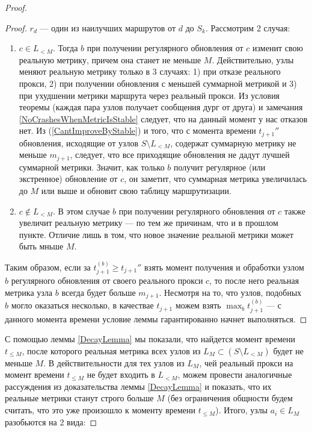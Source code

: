 \documentclass{article}
\theoremstyle{plain}
\theoremstyle{plain}
\theoremstyle{plain}
\theoremstyle{plain}
\theoremstyle{definition}
\theoremstyle{remark}
\theoremstyle{plain}
\begin{document}
\begin{proof}
\begin{proof}
         $r_d$ --- один из наилучших маршрутов от $d$ до $S_k$. Рассмотрим 2 случая:
        
        \begin{enumerate}
            \item $c \in L_{< M}$. Тогда $b$ при получении регулярного обновления от $c$ изменит свою реальную метрику, причем она станет не меньше $M$. Действительно, узлы меняют реальную метрику только в 3 случаях: 1) при отказе реального прокси, 2) при получении обновления с меньшей суммарной метрикой и 3) при ухудшении метрики маршрута через реальный прокси. Из условия теоремы (каждая пара узлов получает сообщения дург от друга) и замечания \ref{NoCrashesWhenMetricIsStable} следует, что на данный момент у нас отказов нет. Из (\ref{CantImproveByStable}) и того, что с момента времени $t_{j + 1}''$ обновления, исходящие от узлов $S \setminus L_{< M}$, содержат суммарную метрику не меньше $m_{j + 1}$, следует, что все приходящие обновления не дадут лучшей суммарной метрики. Значит, как только $b$ получит регулярное (или экстренное) обновление от $c$, он заметит, что суммарная метрика увеличилась до $M$ или выше и обновит свою таблицу маршрутизации.
            
            \item $c \notin L_{< M}$. В этом случае $b$ при получении регулярного обновления от $c$ также увеличит реальную метрику --- по тем же причинам, что и в прошлом пункте. Отличие лишь в том, что новое значение реальной метрики может быть мньше $M$.
        \end{enumerate}
        
        Таким образом, если за $t_{j + 1}^{(b)} \geq t_{j + 1}''$ взять момент получения и обработки узлом $b$ регулярного обновления от своего реального прокси $c$, то после него реальная метрика узла $b$ всегда будет больше $m_{j + 1}$. Несмотря на то, что узлов, подобных $b$ могло оказаться несколько, в качествае $t_{j + 1}$ можем взять $\displaystyle \max_b t_{j + 1}^{(b)}$ --- с данного момента времени условие леммы гарантированно начнет выполняться.
    \end{proof}
    
    С помощью леммы \ref{DecayLemma} мы показали, что найдется момент времени $t_{\leq M}$, после которого реальная метрика всех узлов из $L_M \subset (S \setminus L_{< M})$ будет не меньше $M$. В действительности для тех узлов из $L_M$, чей реальный прокси на момент времени $t_{\leq M}$ не будет входить в $L_{< M}$, можем провести аналогичные рассуждения из доказательства леммы \ref{DecayLemma} и показать, что их реальные метрики станут строго больше $M$ (без ограничения общности будем считать, что это уже произошло к моменту времени $t_{\leq M}$). Итого, узлы $a_i \in L_M$ разобьются на 2 вида:
    

\end{proof}
\end{document}

